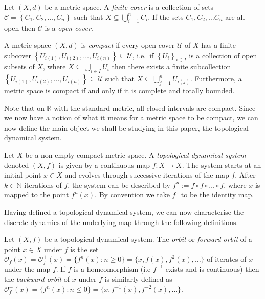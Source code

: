 \begin{defn} \label{defn:cover}
    Let $(X, d)$ be a metric space. A \emph{finite cover} is a collection of sets $\mathcal{C} = \left\lbrace C_1, C_2, \dots, C_n \right\rbrace$ such that $X \subseteq \bigcup_{i = 1}^nC_i$. If the sets $C_1, C_2, \dots C_n$ are all open then $\mathcal{C}$ is a \emph{open cover}.
\end{defn}

\begin{defn} \label{defn:compact}
    A metric space $(X, d)$ is \emph{compact} if every open cover $\mathcal{U}$ of $X$ has a finite subcover $\left\lbrace U_{i(1)}, U_{i(2)}, \dots, U_{i(n)} \right\rbrace \subseteq \mathcal{U}$, i.e.\ if $\left\lbrace U_i \right\rbrace_{i\in I}$ is a collection of open subsets of $X$, where $X \subseteq \bigcup_{i \in I}U_i$ then there exists a finite subcollection $\left\lbrace U_{i(1)}, U_{i(2)}, \dots, U_{i(n)} \right\rbrace \subseteq \mathcal{U}$ such that $X \subseteq \bigcup_{j = 1}^{n}U_{i(j)}$. Furthermore, a metric space is compact if and only if it is complete and totally bounded.
\end{defn}

Note that on $\mathbb{R}$ with the standard metric, all closed intervals are compact. Since we now have a notion of what it means for a metric space to be compact, we can now define the main object we shall be studying in this paper, the topological dynamical system.

\begin{defn} \label{defn:topological-dynamical-system}
    Let $X$ be a non-empty compact metric space. A \emph{topological dynamical system} denoted $(X, f)$ is given by a continuous map $f: X \to X$. The system starts at an initial point $x \in X$ and evolves through successive iterations of the map $f$. After $k \in \mathbb{N}$ iterations of $f$, the system can be described by $f^n := f \circ f \circ \dots \circ f$, where $x$ is mapped to the point $f^n(x)$. By convention we take $f^0$ to be the identity map.
\end{defn}

Having defined a topological dynamical system, we can now characterise the discrete dynamics of the underlying map through the following definitions.

\begin{defn}[Orbit] \label{defn:orbit}
    Let $(X, f)$ be a topological dynamical system. The \emph{orbit} or \emph{forward orbit} of a point $x \in X$ under $f$ is the set $\mathcal{O}_f(x) = \mathcal{O}^+_f(x) = \lbrace f^n(x) : n \geq 0 \rbrace = \lbrace x, f(x), f^2(x), \dots \rbrace$ of iterates of $x$ under the map $f$. If $f$ is a homeomorphism (i.e $f^{-1}$ exists and is continuous) then the \emph{backward orbit} of $x$ under $f$ is similarly defined as $\mathcal{O}^-_f(x) = \lbrace f^n(x) : n \leq 0 \rbrace = \lbrace x, f^{-1}(x), f^{-2}(x), \dots \rbrace$.
\end{defn}

